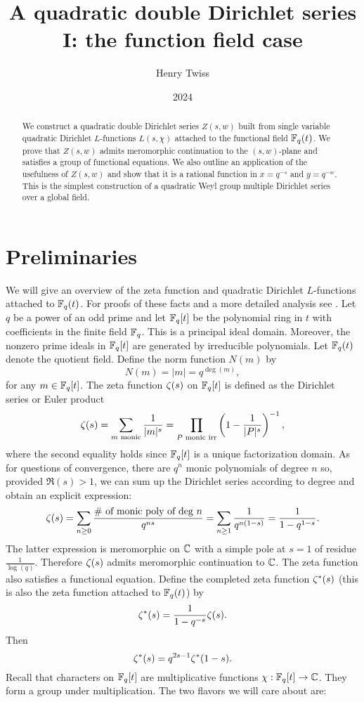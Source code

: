 \documentclass[12pt,reqno,oneside]{amsart}
\title{A quadratic double Dirichlet series I: the function field case}
\author{Henry Twiss}
\date{2024}
\begin{document}
\begin{abstract}
    We construct a quadratic double Dirichlet series $Z(s,w)$ built from single variable quadratic Dirichlet $L$-functions $L(s,\chi)$ attached to the functional field $\mathbb{F}_{q}(t)$. We prove that $Z(s,w)$ admits meromorphic continuation to the $(s,w)$-plane and satisfies a group of functional equations. We also outline an application of the usefulness of $Z(s,w)$ and show that it is a rational function in $x = q^{-s}$ and $y = q^{-w}$. This is the simplest construction of a quadratic Weyl group multiple Dirichlet series over a global field.
\end{abstract}

\maketitle

\section{Preliminaries}
    We will give an overview of the zeta function and quadratic Dirichlet $L$-functions attached to $\mathbb{F}_{q}(t)$. For proofs of these facts and a more detailed analysis see \cite{rosen2002number}. Let $q$ be a power of an odd prime and let $\mathbb{F}_{q}[t]$ be the polynomial ring in $t$ with coefficients in the finite field $\mathbb{F}_{q}$. This is a principal ideal domain. Moreover, the nonzero prime ideals in $\mathbb{F}_{q}[t]$ are generated by irreducible polynomials. Let $\mathbb{F}_{q}(t)$ denote the quotient field. Define the norm function $N(m)$ by
    \[
        N(m) = |m| = q^{\deg(m)},
    \]
    for any $m \in \mathbb{F}_{q}[t]$. The zeta function $\zeta(s)$ on $\mathbb{F}_{q}[t]$ is defined as the Dirichlet series or Euler product
    \[
        \zeta(s) = \sum_{\text{$m$ monic}}\frac{1}{|m|^{s}} = \prod_{\text{$P$ monic irr}}\left(1-\frac{1}{|P|^{s}}\right)^{-1},
    \]
    where the second equality holds since $\mathbb{F}_{q}[t]$ is a unique factorization domain. As for questions of convergence, there are $q^{n}$ monic polynomials of degree $n$ so, provided $\Re(s) > 1$, we can sum up the Dirichlet series according to degree and obtain an explicit expression:
    \[
        \zeta(s) = \sum_{n \ge 0}\frac{\text{\# of monic poly of deg $n$}}{q^{ns}} = \sum_{n \ge 1}\frac{1}{q^{n(1-s)}} = \frac{1}{1-q^{1-s}}.
    \]
    The latter expression is meromorphic on $\mathbb{C}$ with a simple pole at $s = 1$ of residue $\frac{1}{\log(q)}$. Therefore $\zeta(s)$ admits meromorphic continuation to $\mathbb{C}$. The zeta function also satisfies a functional equation. Define the completed zeta function $\zeta^{\ast}(s)$ (this is also the zeta function attached to $\mathbb{F}_{q}(t)$) by
    \[
        \zeta^{\ast}(s) = \frac{1}{1-q^{-s}}\zeta(s).
    \]
    Then
    \[
        \zeta^{\ast}(s) = q^{2s-1}\zeta^{\ast}(1-s).
    \]
    Recall that characters on $\mathbb{F}_{q}[t]$ are multiplicative functions $\chi:\mathbb{F}_{q}[t] \to \mathbb{C}$. They form a group under multiplication. The two flavors we will care about are:
    
\end{document}
